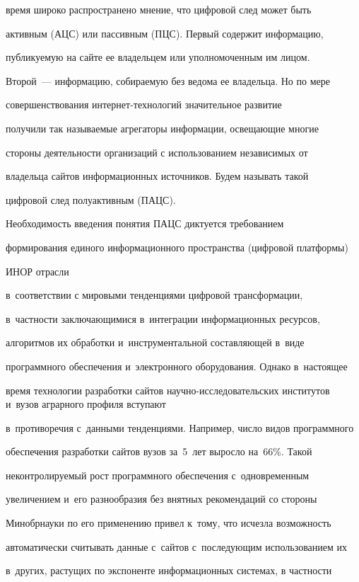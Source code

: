 время широко распространено мнение, что цифровой след может быть 


активным (АЦС) или пассивным (ПЦС). Первый содержит информацию, 


публикуемую на сайте ее владельцем или уполномоченным им лицом. 


Второй~--- информацию, собираемую без ведома ее владельца. Но по мере 


совершенствования ин\-тер\-нет-тех\-но\-ло\-гий значительное развитие 


получили так называемые агрегаторы информации, освещающие многие 


стороны деятельности организаций с использованием независимых от 


владельца сайтов информационных источников. Будем называть такой 


цифровой след полуактивным (ПАЦС).


  


  Необходимость введения понятия ПАЦС диктуется требованием 


формирования единого информационного пространства (цифровой платформы) 


ИНОР отрасли 


в~соответствии с мировыми тенденциями цифровой трансформации, 


в~частности заключающимися в~интеграции информационных ресурсов, 


алгоритмов их обработки и~инструментальной составляющей в~виде 


программного обеспечения и~электронного оборудования. Однако в~настоящее 


время технологии разработки сайтов на\-уч\-но-ис\-сле\-до\-ва\-тель\-ских институтов и~вузов аграрного профиля вступают 


в~противоречия с~данными тенденциями. Например, число видов программного 


обеспечения разработки сайтов вузов за~5~лет выросло на~66\%. Такой 


неконтролируемый рост программного обеспечения с~одновременным 


увеличением и~его разнообразия без внятных рекомендаций со стороны 


Минобрнауки по его применению привел к~тому, что исчезла возможность 


автоматически считывать данные с~сайтов с~последующим использованием их 


в~других, растущих по экспоненте информационных системах, в част\-ности 


